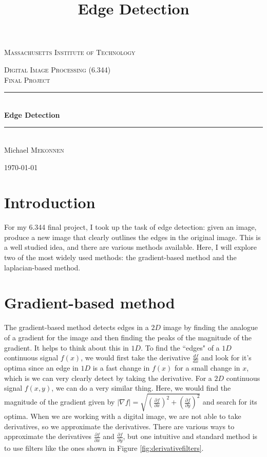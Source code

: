 \documentclass[12pt]{amsart}
\title{Edge Detection}
\newcommand{\HRule}{\rule{\linewidth}{0.5mm}}
\begin{document}
\begin{titlepage}
\begin{center}

\textsc{\LARGE Massachusetts Institute of Technology}\\[1.5cm]

\vspace{4cm}

\textsc{\Large Digital Image Processing (6.344) \\ Final Project}\\[0.5cm]

\HRule \\[0.4cm]
{ \huge \bfseries Edge Detection}\\[0.4cm]
\HRule \\[1.5cm]

\large Michael \textsc{Mekonnen}

\vfill

{\large \today}

\end{center}
\end{titlepage}

\maketitle

\section{Introduction}

For my 6.344 final project, I took up the task of edge detection: given an image, produce a new image that clearly outlines the edges in the original image. This is a well studied idea, and there are various methods available. Here, I will explore two of the most widely used methods: the gradient-based method and the laplacian-based method.

\section{Gradient-based method}

The gradient-based method detects edges in a $2D$ image by finding the analogue of a gradient for the image and then finding the peaks of the magnitude of the gradient. It helps to think about this in $1D$. To find the ``edges" of a $1D$ continuous signal $f(x)$, we would first take the derivative $\frac{df}{dx}$ and look for it's optima since an edge in $1D$ is a fast change in $f(x)$ for a small change in $x$, which is we can very clearly detect by taking the derivative. For a $2D$ continuous signal $f(x,y)$, we can do a very similar thing. Here, we would find the magnitude of the gradient given by $|\nabla f| = \sqrt{(\frac{\partial f}{\partial x})^2 + (\frac{\partial f}{\partial y})^2}$ and search for its optima. When we are working with a digital image, we are not able to take derivatives, so we approximate the derivatives. There are various ways to approximate the derivatives $\frac{\partial f}{\partial x}$ and $\frac{\partial f}{\partial y}$, but one intuitive and standard method is to use filters like the ones shown in Figure \ref{fig:derivativefilters}.
\end{document}
